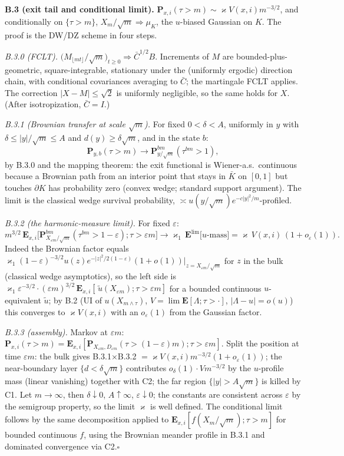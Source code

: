 \documentclass[11pt]{article}
\newcommand{\E}{\mathbf{E}}\newcommand{\Lat}{\mathcal{L}}\renewcommand{\Pr}{\mathbf{P}}
\begin{document}
\textbf{B.3 (exit tail and conditional limit).} $\Pr_{x,i}(\tau>m)\sim\varkappa
V(x,i)m^{-3/2}$, and conditionally on $\{\tau>m\}$, $X_m/\sqrt m\Rightarrow\mu_K$, the
$u$-biased Gaussian on $K$. The proof is the DW/DZ scheme in four steps.

\emph{B.3.0 (FCLT).} $\big(M_{\lfloor mt\rfloor}/\sqrt m\big)_{t\ge0}\Rightarrow
\bar C^{1/2}B$. Increments of $M$ are bounded-plus-geometric, square-integrable,
stationary under the (uniformly ergodic) direction chain, with conditional covariances
averaging to $\bar C$; the martingale FCLT applies. The correction $|X-M|\le\sqrt2$ is
uniformly negligible, so the same holds for $X$. (After isotropization, $\bar C=I$.)

\emph{B.3.1 (Brownian transfer at scale $\sqrt m$).} For fixed $0<\delta<A$, uniformly in
$y$ with $\delta\le|y|/\sqrt m\le A$ and $d(y)\ge\delta\sqrt m$, and in the state $b$:
$$\Pr_{y,b}(\tau>m)\longrightarrow\Pr^{bm}_{y/\sqrt m}(\tau^{bm}>1),$$
by B.3.0 and the mapping theorem: the exit functional is Wiener-a.s.\ continuous because
a Brownian path from an interior point that stays in $\bar K$ on $[0,1]$ but touches
$\partial K$ has probability zero (convex wedge; standard support argument). The limit is
the classical wedge survival probability, $\asymp u(y/\sqrt m)e^{-c|y|^2/m}$-profiled.

\emph{B.3.2 (the harmonic-measure limit).} For fixed $\varepsilon$:
$$m^{3/2}\,\E_{x,i}\Big[\Pr^{bm}_{X_{\varepsilon m}/\sqrt m}(\tau^{bm}>1-\varepsilon);
\tau>\varepsilon m\Big]\longrightarrow\varkappa_1\,\E^{\lim}\big[u\text{-mass}\big]
=\varkappa\,V(x,i)\,(1+o_\varepsilon(1)).$$
Indeed the Brownian factor equals $\varkappa_1(1-\varepsilon)^{-3/2}
u(z)e^{-|z|^2/2(1-\varepsilon)}(1+o(1))|_{z=X_{\varepsilon m}/\sqrt m}$ for $z$ in the
bulk (classical wedge asymptotics), so the left side is
$\varkappa_1\varepsilon^{-3/2}\cdot(\varepsilon m)^{3/2}\,\E_{x,i}[\,\widetilde
u(X_{\varepsilon m});\tau>\varepsilon m]$ for a bounded continuous $u$-equivalent
$\widetilde u$; by B.2 (UI of $u(X_{m\wedge\tau})$, $V=\lim\E[\Lambda;\tau>\cdot]$,
$|\Lambda-u|=o(u)$) this converges to $\varkappa V(x,i)$ with an
$o_\varepsilon(1)$ from the Gaussian factor. 

\emph{B.3.3 (assembly).} Markov at $\varepsilon m$:
$\Pr_{x,i}(\tau>m)=\E_{x,i}[\Pr_{X_{\varepsilon m},D_{\varepsilon m}}
(\tau>(1-\varepsilon)m);\tau>\varepsilon m]$. Split the position at time $\varepsilon m$:
the bulk gives B.3.1$\times$B.3.2 $=\varkappa V(x,i)m^{-3/2}(1+o_\varepsilon(1))$; the
near-boundary layer $\{d<\delta\sqrt m\}$ contributes $o_\delta(1)\cdot Vm^{-3/2}$ by the
$u$-profile mass (linear vanishing) together with C2; the far region $\{|y|>A\sqrt m\}$ is
killed by C1. Let $m\to\infty$, then $\delta\downarrow0$, $A\uparrow\infty$,
$\varepsilon\downarrow0$; the constants are consistent across $\varepsilon$ by the
semigroup property, so the limit $\varkappa$ is well defined. The conditional limit
follows by the same decomposition applied to
$\E_{x,i}[f(X_m/\sqrt m);\tau>m]$ for bounded continuous $f$, using the Brownian meander
profile in B.3.1 and dominated convergence via C2.\hfill$\square$
\end{document}
